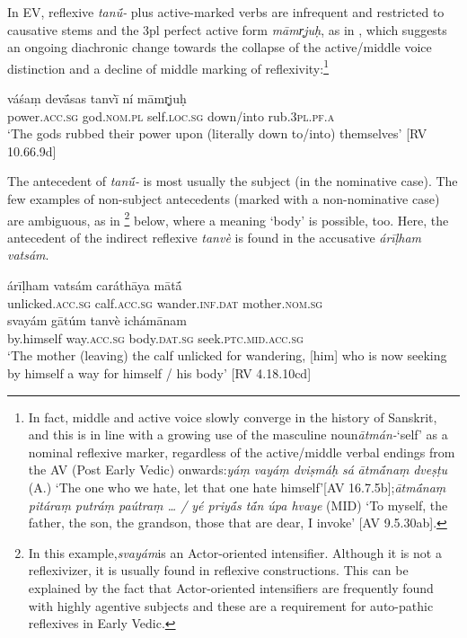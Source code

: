 \documentclass[output=paper]{langscibook}
\begin{document}
{In EV, reflexive \textit{tan\'{ū}-} plus active-marked verbs are infrequent and restricted to causative stems and the 3pl perfect active form \textit{māmr̥juḥ}, as in , which suggests an ongoing diachronic change towards the collapse of the active/middle voice distinction and a decline of middle marking of reflexivity:}\footnote{{{In fact, middle and active voice slowly converge in the history of Sanskrit, and this is in line with a growing use of the masculine noun}{\textit{ātmán-}}{‘self’ as a nominal reflexive marker, regardless of the active/middle verbal endings from the AV (Post Early Vedic) onwards:}{\textit{yáṃ}}{ \textit{vay}}{\textit{áṃ dviṣmáḥ sá} }{{\textit{ātm\'{ā}naṃ} }}{\textit{dveṣṭu} }{(A.) ‘The one who we hate, let that one hate himself’[AV 16.7.5b];}{{\textit{ātm\'{ā}naṃ}}}{ \textit{pitáraṃ putráṃ paútraṃ … / yé priy\'{ā}s t\'{ā}n úpa hvaye} }{(MID) ‘To myself, the father, the son, the grandson, those that are dear, I invoke’ [AV 9.5.30ab].}}}

\ea%
    \label{ex:Orqueda:18}
\gll váśaṃ  dev\'{ā}sas  tanv\`{ī}  ní  māmr̥juḥ\\
   power.\textsc{acc.sg}    god.\textsc{nom.pl}  self.\textsc{loc.sg}  down/into  rub.\textsc{3pl.pf.a}\\
\glt ‘The gods rubbed their power upon (literally down to/into) themselves’ [RV 10.66.9d]
\z

{The antecedent of \textit{tan\'{ū}-} is most usually the subject (in the nominative case). The few examples of non-subject antecedents (marked with a non-nominative case) are ambiguous, as in }\footnote{{{In this example,}{\textit{svayám}}{is an Actor-oriented intensifier. Although it is not a reflexivizer, it is usually found in reflexive constructions. This can be explained by the fact that Actor-oriented intensifiers are frequently found with highly agentive subjects and these are a requirement for auto-pathic reflexives in Early Vedic.}}}{ below, where a meaning ‘body’ is possible, too. Here, the antecedent of the indirect reflexive \textit{tanvè} is found in the accusative \textit{árīḷham vatsám}.}

\ea%
    \label{ex:Orqueda:19}
\gll árīḷham  vatsám  caráthāya  māt\'{ā}\\
  unlicked.\textsc{acc.sg}  calf.\textsc{acc.sg}  wander.\textsc{inf.dat}  mother.\textsc{nom.sg}\\

\gll svayám  gātúm  tanvè  ichámānam\\
    by.himself  way.\textsc{acc.sg}   body.\textsc{dat.sg}  seek.\textsc{ptc.mid.acc.sg}\\
\glt `The mother (leaving) the calf unlicked for wandering, [him] who is now seeking by himself a way for himself / his body’ [RV 4.18.10cd]
\z
\end{document}

